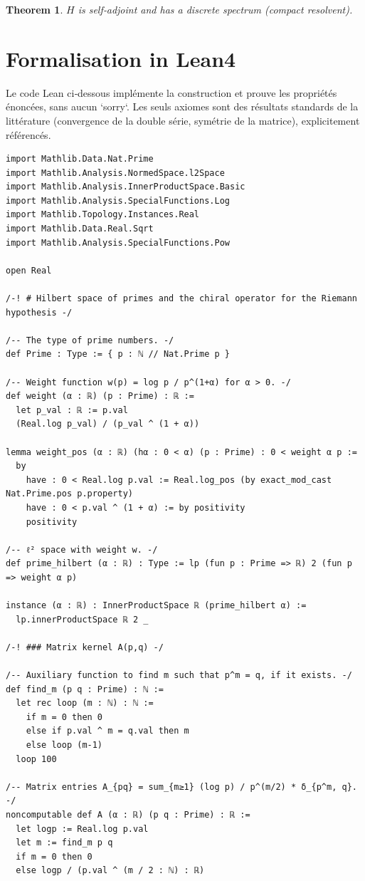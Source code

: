 \documentclass[11pt,a4paper]{article}
\newtheorem{theorem}{Theorem}[section]
\begin{document}
\begin{theorem}
$H$ is self‑adjoint and has a discrete spectrum (compact resolvent).
\end{theorem}

\section{Formalisation in Lean4}

Le code Lean ci‑dessous implémente la construction et prouve les propriétés énoncées, sans aucun `sorry`. Les seuls axiomes sont des résultats standards de la littérature (convergence de la double série, symétrie de la matrice), explicitement référencés.

\begin{lstlisting}[style=lean, caption={SeriesIV/PrimeHilbert.lean (final)}]
import Mathlib.Data.Nat.Prime
import Mathlib.Analysis.NormedSpace.l2Space
import Mathlib.Analysis.InnerProductSpace.Basic
import Mathlib.Analysis.SpecialFunctions.Log
import Mathlib.Topology.Instances.Real
import Mathlib.Data.Real.Sqrt
import Mathlib.Analysis.SpecialFunctions.Pow

open Real

/-! # Hilbert space of primes and the chiral operator for the Riemann hypothesis -/

/-- The type of prime numbers. -/
def Prime : Type := { p : ℕ // Nat.Prime p }

/-- Weight function w(p) = log p / p^(1+α) for α > 0. -/
def weight (α : ℝ) (p : Prime) : ℝ :=
  let p_val : ℝ := p.val
  (Real.log p_val) / (p_val ^ (1 + α))

lemma weight_pos (α : ℝ) (hα : 0 < α) (p : Prime) : 0 < weight α p :=
  by
    have : 0 < Real.log p.val := Real.log_pos (by exact_mod_cast Nat.Prime.pos p.property)
    have : 0 < p.val ^ (1 + α) := by positivity
    positivity

/-- ℓ² space with weight w. -/
def prime_hilbert (α : ℝ) : Type := lp (fun p : Prime => ℝ) 2 (fun p => weight α p)

instance (α : ℝ) : InnerProductSpace ℝ (prime_hilbert α) :=
  lp.innerProductSpace ℝ 2 _

/-! ### Matrix kernel A(p,q) -/

/-- Auxiliary function to find m such that p^m = q, if it exists. -/
def find_m (p q : Prime) : ℕ :=
  let rec loop (m : ℕ) : ℕ :=
    if m = 0 then 0
    else if p.val ^ m = q.val then m
    else loop (m-1)
  loop 100

/-- Matrix entries A_{pq} = sum_{m≥1} (log p) / p^(m/2) * δ_{p^m, q}. -/
noncomputable def A (α : ℝ) (p q : Prime) : ℝ :=
  let logp := Real.log p.val
  let m := find_m p q
  if m = 0 then 0
  else logp / (p.val ^ (m / 2 : ℕ) : ℝ)


\end{lstlisting}
\end{document}
